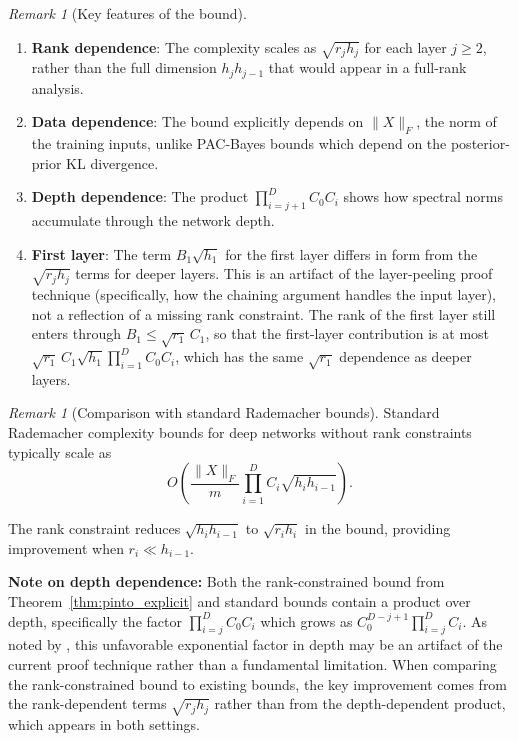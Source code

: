 \documentclass{article}
\theoremstyle{plain}
\theoremstyle{definition}
\theoremstyle{remark}
\newtheorem{remark}[theorem]{Remark}
\begin{document}
\begin{remark}[Key features of the bound]
\begin{enumerate}
    \item \textbf{Rank dependence}: The complexity scales as $\sqrt{r_j h_j}$ for each layer $j\ge 2$, rather than the full dimension $h_j h_{j-1}$ that would appear in a full-rank analysis.
    
    \item \textbf{Data dependence}: The bound explicitly depends on $\|X\|_F$, the norm of the training inputs, unlike PAC-Bayes bounds which depend on the posterior-prior KL divergence.
    
    \item \textbf{Depth dependence}: The product $\prod_{i=j+1}^D C_0 C_i$ shows how spectral norms accumulate through the network depth.
    
    \item \textbf{First layer}: The term $B_1\sqrt{h_1}$ for the first layer differs in form from the $\sqrt{r_j h_j}$ terms for deeper layers. This is an artifact of the layer-peeling proof technique (specifically, how the chaining argument handles the input layer), not a reflection of a missing rank constraint. The rank of the first layer still enters through $B_1 \le \sqrt{r_1}\,C_1$, so that the first-layer contribution is at most $\sqrt{r_1}\,C_1\sqrt{h_1}\prod_{i=1}^D C_0 C_i$, which has the same $\sqrt{r_1}$ dependence as deeper layers.
\end{enumerate}
\end{remark}

\begin{remark}[Comparison with standard Rademacher bounds]
Standard Rademacher complexity bounds for deep networks without rank constraints typically scale as
\[
O\left(\frac{\|X\|_F}{m}\prod_{i=1}^D C_i \sqrt{h_i h_{i-1}}\right).
\]

The rank constraint reduces $\sqrt{h_i h_{i-1}}$ to $\sqrt{r_i h_i}$ in the bound, providing improvement when $r_i \ll h_{i-1}$.

\textbf{Note on depth dependence:} Both the rank-constrained bound from Theorem~\ref{thm:pinto_explicit} and standard bounds contain a product over depth, specifically the factor $\prod_{i=j}^D C_0 C_i$ which grows as $C_0^{D-j+1}\prod_{i=j}^D C_i$. As noted by \citet{pinto2025on}, this unfavorable exponential factor in depth may be an artifact of the current proof technique rather than a fundamental limitation. When comparing the rank-constrained bound to existing bounds, the key improvement comes from the rank-dependent terms $\sqrt{r_j h_j}$ rather than from the depth-dependent product, which appears in both settings.
\end{remark}
\end{document}
